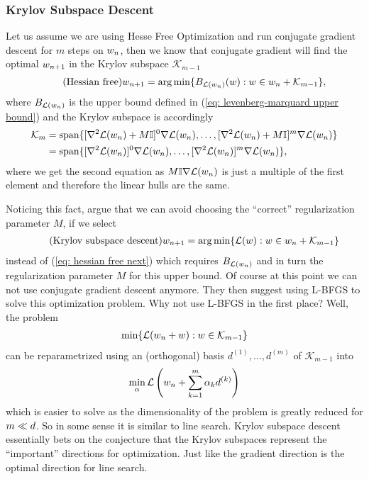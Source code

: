 \subsubsection{Krylov Subspace Descent}

Let us assume we are using Hesse Free Optimization and run conjugate gradient
descent for \(m\) steps on \(w_n\), then we know that conjugate gradient
will find the optimal \(w_{n+1}\) in the Krylov subspace \(\mathcal{K}_{m-1}\)
\begin{align}\label{eq: hessian free next}
	\tag{Hessian free}
	w_{n+1} = \arg\min \{ B_{\mathcal{L}(w_n)}(w) : w \in w_n + \mathcal{K}_{m-1} \},
\end{align}
where \(B_{\mathcal{L}(w_n)}\) is the upper bound defined in (\ref{eq:
levenberg-marquard upper bound}) and the Krylov subspace is accordingly
\begin{align*}
	\mathcal{K}_m
	&= \text{span}\{
		[\nabla^2\mathcal{L}(w_n) + M\mathbb{I}]^0 \nabla\mathcal{L}(w_n), \dots,
		[\nabla^2\mathcal{L}(w_n) + M\mathbb{I}]^m \nabla\mathcal{L}(w_n)
	\}	\\
	&= \text{span}\{
		[\nabla^2\mathcal{L}(w_n)]^0 \nabla\mathcal{L}(w_n), \dots,
		[\nabla^2\mathcal{L}(w_n)]^m \nabla\mathcal{L}(w_n)
	\},
\end{align*}
where we get the second equation as \(M\mathbb{I} \nabla\mathcal{L}(w_n)\) is
just a multiple of the first element and therefore the linear hulls are the
same.

Noticing this fact, \textcite{vinyalsKrylovSubspaceDescent2012} argue that we
can avoid choosing the ``correct'' regularization parameter \(M\), if we
select
\begin{align}\label{eq: krylov subspace descent}
	\tag{Krylov subspace descent}
	w_{n+1}
	= \arg\min \{ \mathcal{L}(w) : w \in w_n + \mathcal{K}_{m-1} \}
\end{align}
instead of (\ref{eq: hessian free next}) which requires \(B_{\mathcal{L}(w_n)}\)
and in turn the regularization parameter \(M\) for this upper bound. Of course
at this point we can not use conjugate gradient descent anymore. They then suggest
using L-BFGS to solve this optimization problem. Why not use L-BFGS in the first
place? Well, the problem
\begin{align*}
	\min \{ \mathcal{L}(w_n + w) : w \in \mathcal{K}_{m-1} \}
\end{align*}
can be reparametrized using an (orthogonal) basis \(d^{(1)}, \dots, d^{(m)}\)
of \(\mathcal{K}_{m-1}\) into
\begin{align*}
	\min_{\alpha} \mathcal{L}\left(w_n + \sum_{k=1}^m \alpha_k d^{(k)} \right)
\end{align*}
which is easier to solve as the dimensionality of the problem is greatly
reduced for \(m\ll d\). So in some sense it is similar to
line search. Krylov subspace descent essentially bets on the conjecture that the
Krylov subspaces represent the ``important'' directions for optimization. Just
like the gradient direction is the optimal direction for line search.

